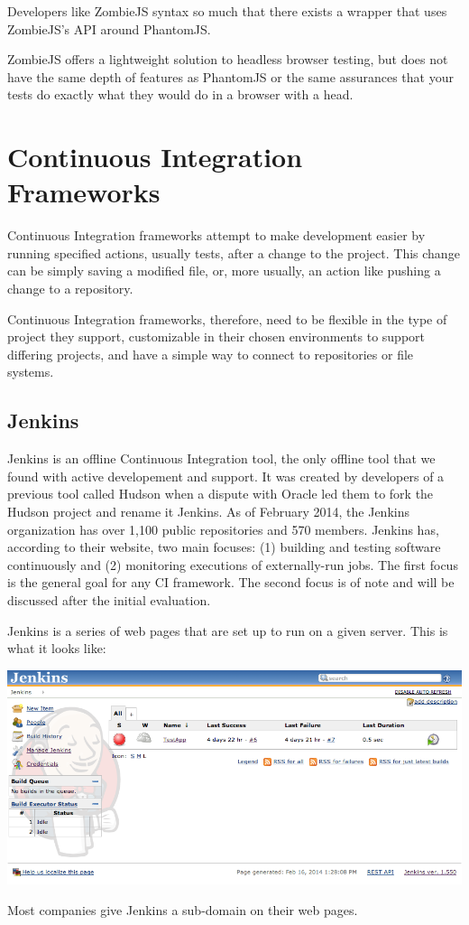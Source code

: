 \documentclass[12pt]{ucthesis}
\newenvironment{Figure}
  {\par\medskip\noindent\minipage{\linewidth}}
  {\endminipage\par\medskip}
\begin{document}
Developers like ZombieJS syntax so much that there exists a wrapper that uses ZombieJS's API around PhantomJS. \cite{ZombiePhantom}

ZombieJS offers a lightweight solution to headless browser testing, but does not have the same depth of features as PhantomJS or the same assurances that your tests do exactly what they would do in a browser with a head.

\section{Continuous Integration Frameworks}
Continuous Integration frameworks attempt to make development easier by running specified actions, usually tests, after a change to the project. This change can be simply saving a modified file, or, more usually, an action like pushing a change to a repository.

Continuous Integration frameworks, therefore, need to be flexible in the type of project they support, customizable in their chosen environments to support differing projects, and have a simple way to connect to repositories or file systems.

\subsection{Jenkins}
Jenkins\cite{Jenkins} is an offline Continuous Integration tool, the only offline tool that we found with active developement and support. It was created by developers of a previous tool called Hudson when a dispute with Oracle led them to fork the Hudson project and rename it Jenkins. As of February 2014, the Jenkins organization has over 1,100 public repositories and 570 members. \cite{JenkinsGitHub} Jenkins has, according to their website, two main focuses: (1) building and testing software continuously and (2) monitoring executions of externally-run jobs. The first focus is the general goal for any CI framework. The second focus is of note and will be discussed after the initial evaluation. 

Jenkins is a series of web pages that are set up to run on a given server. This is what it looks like:
\begin{Figure}
  \centering
  \includegraphics[width=0.95\linewidth]{jenkins.png}

\end{Figure}
Most companies give Jenkins a sub-domain on their web pages.
\end{document}
